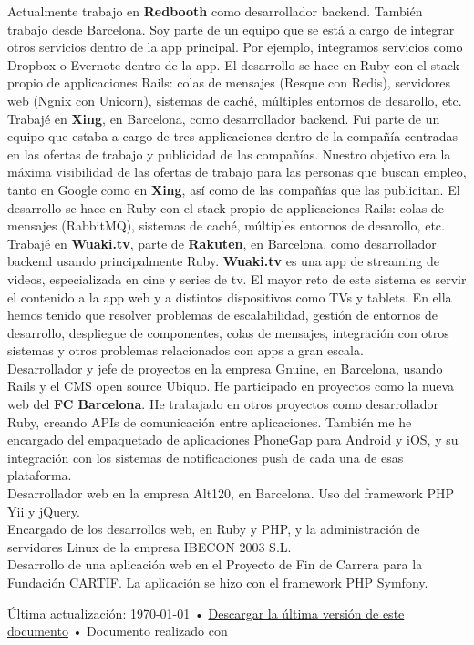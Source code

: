 \documentclass[10pt, a4paper]{article}
\begin{document}
\noindent{} Actualmente trabajo en \textbf{Redbooth} como desarrollador backend. También trabajo desde Barcelona. Soy parte de un equipo que se está a cargo de integrar otros servicios dentro de la app principal. Por ejemplo, integramos servicios como Dropbox o Evernote dentro de la app. El desarrollo se hace en Ruby con el stack propio de applicaciones Rails: colas de mensajes (Resque con Redis), servidores web (Ngnix con Unicorn), sistemas de caché, múltiples entornos de desarollo, etc.\\[.2cm]
\noindent{} Trabajé en \textbf{Xing}, en Barcelona, como desarrollador backend. Fui parte de un equipo que estaba a cargo de tres applicaciones dentro de la compañía centradas en las ofertas de trabajo y publicidad de las compañías. Nuestro objetivo era la máxima visibilidad de las ofertas de trabajo para las personas que buscan empleo, tanto en Google como en \textbf{Xing}, así como de las compañías que las publicitan. El desarrollo se hace en Ruby con el stack propio de applicaciones Rails: colas de mensajes (RabbitMQ), sistemas de caché, múltiples entornos de desarollo, etc.\\[.2cm]
\noindent{} Trabajé en \textbf{Wuaki.tv}, parte de \textbf{Rakuten}, en Barcelona, como desarrollador backend usando principalmente Ruby. \textbf{Wuaki.tv} es una app de streaming de videos, especializada en cine y series de tv. El mayor reto de este sistema es servir el contenido a la app web y a distintos dispositivos como TVs y tablets. En ella hemos tenido que resolver problemas de escalabilidad, gestión de entornos de desarrollo, despliegue de componentes, colas de mensajes, integración con otros sistemas y otros problemas relacionados con apps a gran escala.\\[.2cm]
\noindent{} Desarrollador y jefe de proyectos en la empresa Gnuine, en Barcelona, usando Rails y el CMS open source Ubiquo. He participado en proyectos como la nueva web del \textbf{FC Barcelona}. He trabajado en otros proyectos como desarrollador Ruby, creando APIs de comunicación entre aplicaciones. También me he encargado del empaquetado de aplicaciones PhoneGap para Android y iOS, y su integración con los sistemas de notificaciones push de cada una de esas plataforma.\\[.2cm]
\noindent{} Desarrollador web en la empresa Alt120, en Barcelona. Uso del framework PHP Yii y jQuery.\\[.2cm]
\noindent{} Encargado de los desarrollos web, en Ruby y PHP, y la administración de servidores Linux de la empresa IBECON 2003 S.L.\\[.2cm]
\noindent{} Desarrollo de una aplicación web en el Proyecto de Fin de Carrera para la Fundación CARTIF. La aplicación se hizo con el framework PHP Symfony.

\begin{center}
{\scriptsize  Última actualización: \today\- •\- \href{https://raw.github.com/jhbabon/cv/master/cv_es.pdf}{Descargar la última versión de este documento}\- •\- Documento realizado con \href{http://nitens.org/taraborelli/cvtex}{ \XeTeX }}
\end{center}
\end{document}
